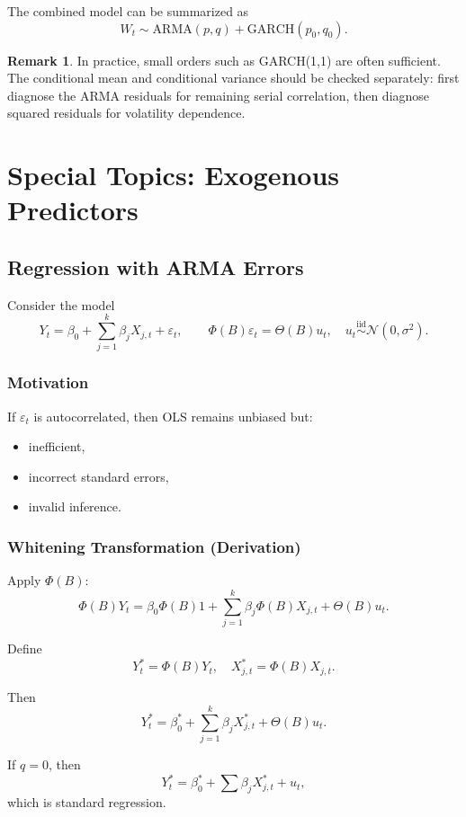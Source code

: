 \documentclass[12pt,oneside]{book}
\numberwithin{equation}{section}
\theoremstyle{definition}
\newtheorem{remark}{Remark}[section]
\theoremstyle{plain}
\theoremstyle{remark}
\newcommand{\iid}{\overset{\text{iid}}{\sim}}
\newcommand{\Normal}{\mathcal{N}}
\begin{document}
The combined model can be summarized as
\[
W_t\sim \mathrm{ARMA}(p,q)+\mathrm{GARCH}(p_0,q_0).
\]

\begin{remark}
In practice, small orders such as GARCH(1,1) are often sufficient. The conditional mean and conditional variance should be checked separately: first diagnose the ARMA residuals for remaining serial correlation, then diagnose squared residuals for volatility dependence.
\end{remark}

\chapter{Special Topics: Exogenous Predictors}

\section{Regression with ARMA Errors}

Consider the model
\[
Y_t = \beta_0 + \sum_{j=1}^k \beta_j X_{j,t} + \varepsilon_t,
\qquad
\Phi(B)\varepsilon_t = \Theta(B) u_t,\quad u_t \iid \Normal(0,\sigma^2).
\]

\subsection{Motivation}

If $\varepsilon_t$ is autocorrelated, then OLS remains unbiased but:
\begin{itemize}
\item inefficient,
\item incorrect standard errors,
\item invalid inference.
\end{itemize}

\subsection{Whitening Transformation (Derivation)}

Apply $\Phi(B)$:
\[
\Phi(B)Y_t = \beta_0 \Phi(B)1 + \sum_{j=1}^k \beta_j \Phi(B)X_{j,t} + \Theta(B)u_t.
\]

Define
\[
Y_t^\ast = \Phi(B)Y_t, \quad X_{j,t}^\ast = \Phi(B)X_{j,t}.
\]

Then
\[
Y_t^\ast = \beta_0^\ast + \sum_{j=1}^k \beta_j X_{j,t}^\ast + \Theta(B)u_t.
\]

If $q=0$, then
\[
Y_t^\ast = \beta_0^\ast + \sum \beta_j X_{j,t}^\ast + u_t,
\]
which is standard regression.
\end{document}
